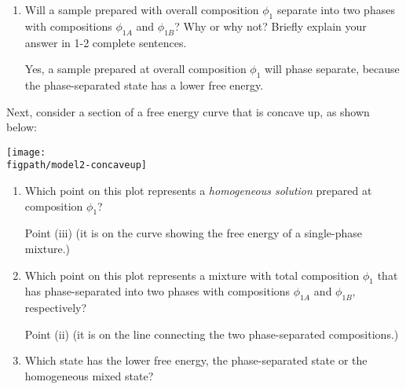 \begin{activity}
\begin{ctqs}
\begin{enumerate}
				\item Will a sample prepared with overall composition $\phi_1$ separate into two phases with compositions $\phi_{1A}$ and $\phi_{1B}$?  Why or why not?  Briefly explain your answer in 1-2 complete sentences.
					
					\begin{solution}[1.5in]
					
						Yes, a sample prepared at overall composition $\phi_1$ will phase separate, because the phase-separated state has a lower free energy.
					
					\end{solution}
					
			\end{enumerate}
			
		\clearpage
		\question Next, consider a section of a free energy curve that is concave up, as shown below:
	
		\vspace{0.1in}
		\centerline{\texttt{[image: \\figpath/model2-concaveup]}}

			\begin{enumerate}
				\item Which point on this plot represents a \emph{homogeneous solution} prepared at composition $\phi_1$?
					
					\begin{solution}[0.75in]
					
						Point (iii) (it is on the curve showing the free energy of a single-phase mixture.)
						
					\end{solution}
					
				\item Which point on this plot represents a mixture with total composition $\phi_1$ that has phase-separated into two phases with compositions $\phi_{1A}$ and $\phi_{1B}$, respectively?
					
					\begin{solution}[0.75in]
					
						Point (ii) (it is on the line connecting the two phase-separated compositions.)
						
					\end{solution}
					
				\item Which state has the lower free energy, the phase-separated state or the homogeneous mixed state?
					
					\begin{solution}[0.75in]
					

\end{solution}
\end{enumerate}
\end{ctqs}
\end{activity}
